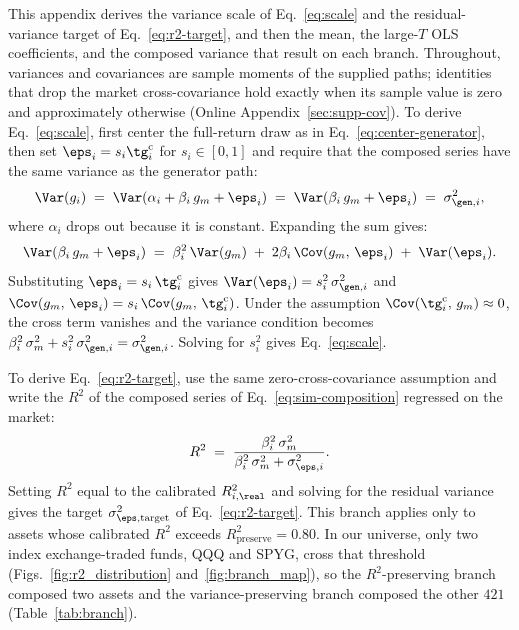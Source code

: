 This appendix derives the variance scale of Eq.~\eqref{eq:scale} and
the residual-variance target of Eq.~\eqref{eq:r2-target}, and then the
mean, the large-$T$ OLS coefficients, and the composed variance that
result on each branch. Throughout, variances and covariances are
sample moments of the supplied paths; identities that drop the market
cross-covariance hold exactly when its sample value is zero and
approximately otherwise (Online Appendix~\ref{sec:supp-cov}). To
derive Eq.~\eqref{eq:scale}, first center the full-return
draw as in Eq.~\eqref{eq:center-generator}, then set
$\eps_i=s_i\tg_i^{\mathrm c}$ for $s_i\in[0,1]$ and require
that the composed series have the same variance as the generator
path:
\begin{equation}
  \Var(g_i) \;=\; \Var(\alpha_i + \beta_i\, g_m + \eps_i)
            \;=\; \Var(\beta_i\, g_m + \eps_i)
            \;=\; \sigma_{\gen,i}^2,
\end{equation}
where $\alpha_i$ drops out because it is constant. Expanding the sum
gives:
\begin{equation}
  \Var(\beta_i\, g_m + \eps_i) \;=\; \beta_i^2\, \Var(g_m)
  \;+\; 2 \beta_i\, \Cov(g_m,\, \eps_i)
  \;+\; \Var(\eps_i).
\end{equation}
Substituting $\eps_i = s_i\,\tg_i^{\mathrm c}$ gives
$\Var(\eps_i) = s_i^2\,\sigma_{\gen,i}^2$ and
$\Cov(g_m,\, \eps_i) = s_i\,\Cov(g_m,\, \tg_i^{\mathrm c})$. Under the
assumption $\Cov(\tg_i^{\mathrm c},\,g_m)\approx0$, the cross term vanishes and
the variance condition becomes
$\beta_i^2\, \sigma_m^2 + s_i^2\, \sigma_{\gen,i}^2 =
\sigma_{\gen,i}^2$. Solving for $s_i^2$ gives Eq.~\eqref{eq:scale}.

To derive Eq.~\eqref{eq:r2-target}, use the same zero-cross-covariance
assumption and write the $R^2$ of the composed series of
Eq.~\eqref{eq:sim-composition} regressed on the market:
\begin{equation}
  R^2 \;=\; \frac{\beta_i^2\, \sigma_m^2}{\beta_i^2\, \sigma_m^2 + \sigma_{\eps,i}^2}.
\end{equation}
Setting $R^2$ equal to the calibrated $R^2_{i,\real}$ and solving for
the residual variance gives the target $\sigma_{\eps,\mathrm{target}}^2$
of Eq.~\eqref{eq:r2-target}. This branch applies only to assets whose
calibrated $R^2$ exceeds $R^2_{\mathrm{preserve}} = 0.80$. In our
universe, only two index exchange-traded funds, QQQ and SPYG, cross
that threshold (Figs.~\ref{fig:r2_distribution}
and~\ref{fig:branch_map}), so the $R^2$-preserving branch composed two
assets and the variance-preserving branch composed the other $421$
(Table~\ref{tab:branch}).

